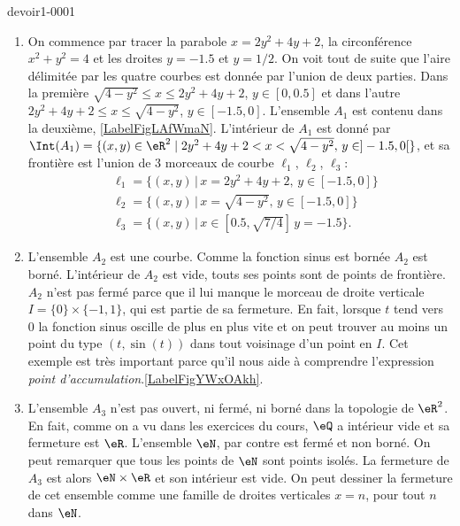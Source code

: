 \begin{corrige}{devoir1-0001}
  \begin{enumerate}
  \item On commence par tracer la  parabole  $x=2y^2+4y+2$, la circonférence $x^2+y^2=4$ et les droites $y=-1.5$ et $y=1/2$. On voit tout de suite que l'aire délimitée par les quatre courbes est donnée par l'union de deux parties. Dans la première $\sqrt{4- y^2}\leq x\leq 2y^2+4y+2$, $y\in [0,0.5]$ et dans l'autre $2y^2+4y+2\leq x\leq \sqrt{4- y^2}$, $y\in [-1.5, 0]$. L'ensemble $A_1$ est contenu dans la deuxième, \ref{LabelFigLAfWmaN}. L'intérieur de $A_1$ est donné par $\Int(A_1) = \{ (x, y ) \in \eR^2 \; | \; 2y^2+4y+2<x< \sqrt{4- y^2},\, y\in ]-1.5, 0[ \}$, et sa frontière est l'union de 3 morceaux de courbe $\ell_1$, $\ell_2$, $\ell_3$:
      \begin{equation}
        \begin{aligned}
          &\ell_1=\{(x,y)\, |\, x=2y^2+4y+2,\, y\in [-1.5, 0] \}\\
          &\ell_2=\{(x,y)\, |\, x=\sqrt{4-y^2},\, y\in [-1.5, 0] \}\\
          &\ell_3=\{(x,y)\, |\, x\in [0.5, \sqrt{7/4}]\, y=-1.5 \}.
        \end{aligned}
      \end{equation}

\newcommand{\CaptionFigLAfWmaN}{}


  \item L'ensemble $A_2$ est une courbe. Comme la fonction sinus est bornée $A_2$ est borné. L'intérieur de $A_2$ est vide, touts ses points sont de points de frontière. $A_2$ n'est pas fermé parce que il lui manque le morceau de droite verticale $I=\{0\}\times\{-1,1\}$, qui est partie de sa fermeture. En fait, lorsque $t$ tend vers $0$ la fonction sinus oscille de plus en plus vite et on peut trouver au moins  un point du type $(t,\sin(t))$ dans tout voisinage d'un point en $I$. Cet exemple est très important parce qu'il nous aide à comprendre l'expression \emph{point d'accumulation}.\ref{LabelFigYWxOAkh}. %
\newcommand{\CaptionFigYWxOAkh}{}


      
  \item L'ensemble $A_3$ n'est pas ouvert, ni fermé, ni borné dans la topologie de $\eR^2$. En fait, comme on a vu dans les exercices du cours, $\eQ$ a intérieur vide et sa fermeture est $\eR$. L'ensemble $\eN$, par contre est fermé et non borné. On peut remarquer que tous les points de $\eN$ sont points isolés. La fermeture de $A_3$ est alors $\eN\times \eR$ et son intérieur est vide. On peut dessiner la fermeture de cet ensemble comme une famille de droites verticales $x=n$, pour tout $n$ dans $\eN$.
    
  \end{enumerate}
\end{corrige}



